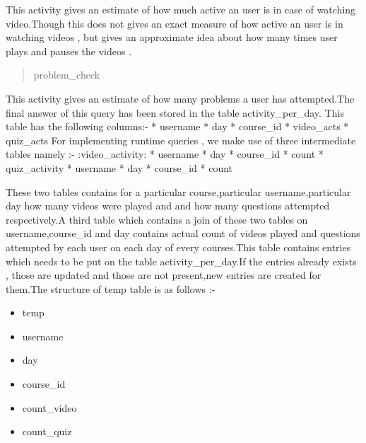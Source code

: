 \documentclass[a4paper,12pt,oneside]{sphinxmanual}
\begin{document}
\begin{DUlineblock}{0em}
\item[] This activity gives an estimate of how much active an user is in case of watching video.Though this does not gives an exact measure of how active an user is in watching videos , but gives an approximate idea about how many times user plays and pauses the videos .
\end{DUlineblock}
\begin{quote}\begin{description}
\item[{problem\_check}] \leavevmode
\end{description}\end{quote}

This activity gives an estimate of how many problems a user has attempted.The final answer of this query has been stored in the table
activity\_per\_day.
\textbar{} This table has the following columns:-
* username
* day
* course\_id
* video\_acts
* quiz\_acts
\textbar{} For implementing runtime queries , we make use of three intermediate tables namely :-
:video\_activity:
* username
* day
* course\_id
* count
* quiz\_activity
* username
* day
* course\_id
* count

\begin{DUlineblock}{0em}
\item[] These two tables contains for a particular course,particular username,particular day how many videos were played and and how many questions attempted respectively.A third table which contains a join of these two tables on username,course\_id and day contains actual count  of videos played and questions attempted by each user on each day of every courses.This table contains entries which needs to be put on the table activity\_per\_day.If the entries already exists , those are updated and those are not present,new entries are created for them.The structure of temp table is as follows :-
\end{DUlineblock}
\begin{itemize}
\item {} 
temp

\item {} 
username

\item {} 
day

\item {} 
course\_id

\item {} 
count\_video

\item {} 
count\_quiz

\end{itemize}
\end{document}
